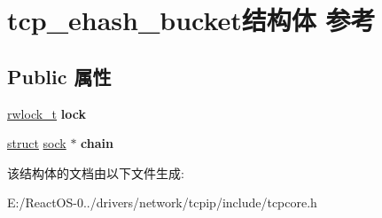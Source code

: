 \hypertarget{structtcp__ehash__bucket}{}\section{tcp\+\_\+ehash\+\_\+bucket结构体 参考}
\label{structtcp__ehash__bucket}
\subsection*{Public 属性}
\begin{DoxyCompactItemize}
\item 
\mbox{\label{structtcp__ehash__bucket_aa0205ecfceeee5ad80804b06fd41d166}} 
\hyperlink{structrwlock__t}{rwlock\+\_\+t} {\bfseries lock}
\item 
\mbox{\label{structtcp__ehash__bucket_a8b6776950c3368e566a62f4c595cc181}} 
\hyperlink{interfacestruct}{struct} \hyperlink{structsock}{sock} $\ast$ {\bfseries chain}
\end{DoxyCompactItemize}


该结构体的文档由以下文件生成\+:\begin{DoxyCompactItemize}
\item 
E\+:/\+React\+O\+S-\/0../drivers/network/tcpip/include/tcpcore.\+h\end{DoxyCompactItemize}
